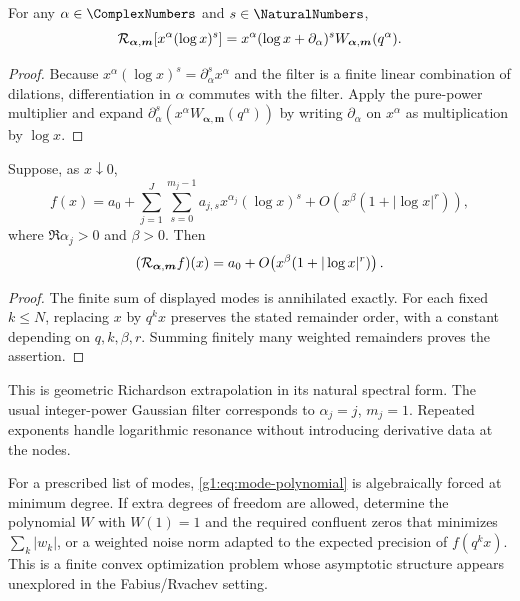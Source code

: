 \begin{corollary}
For any $\alpha\in\ComplexNumbers$ and $s\in\NaturalNumbers$,
\begin{equation}
 \mathcal R_{\bm\alpha,\bm m}
 [x^\alpha(\log x)^s]
 =x^\alpha(\log x+\partial_\alpha)^s
  W_{\bm\alpha,\bm m}(q^\alpha).
 \label{g1:eq:general-mode-multiplier}
\end{equation}
\end{corollary}

\begin{proof}
Because $x^\alpha(\log x)^s=\partial_\alpha^s x^\alpha$ and the
filter is a finite linear combination of dilations, differentiation in
$\alpha$ commutes with the filter.  Apply the pure-power multiplier and
expand $\partial_\alpha^s\!\left(x^\alpha
W_{\bm\alpha,\bm m}(q^\alpha)\right)$ by writing
$\partial_\alpha$ on $x^\alpha$ as multiplication by $\log x$.
\end{proof}

\begin{theorem}
Suppose, as $x\downarrow0$,
\begin{equation}
 f(x)=a_0+
 \sum_{j=1}^J\sum_{s=0}^{m_j-1}
 a_{j,s}x^{\alpha_j}(\log x)^s
 +O\!\left(x^\beta(1+|\log x|^r)\right),
 \label{g1:eq:puiseux-log-expansion}
\end{equation}
where $\Re\alpha_j>0$ and $\beta>0$.  Then
\begin{equation}
 (\mathcal R_{\bm\alpha,\bm m}f)(x)
 =a_0+O\!\left(x^\beta(1+|\log x|^r)\right).
 \label{g1:eq:puiseux-acceleration}
\end{equation}
\end{theorem}

\begin{proof}
The finite sum of displayed modes is annihilated exactly.  For each fixed
$k\le N$, replacing $x$ by $q^kx$ preserves the stated remainder order, with a
constant depending on $q,k,\beta,r$.  Summing finitely many weighted remainders
proves the assertion.
\end{proof}

\begin{remark}
This is geometric Richardson extrapolation in its natural spectral form.  The
usual integer-power Gaussian filter corresponds to
$\alpha_j=j$, $m_j=1$.  Repeated exponents handle logarithmic resonance without
introducing derivative data at the nodes.
\end{remark}

\begin{problem}
For a prescribed list of modes, \eqref{g1:eq:mode-polynomial} is algebraically
forced at minimum degree.  If extra degrees of freedom are allowed, determine
the polynomial $W$ with $W(1)=1$ and the required confluent zeros that minimizes
$\sum_k|w_k|$, or a weighted noise norm adapted to the expected precision of
$f(q^kx)$.  This is a finite convex optimization problem whose asymptotic
structure appears unexplored in the Fabius/Rvachev setting.
\end{problem}

